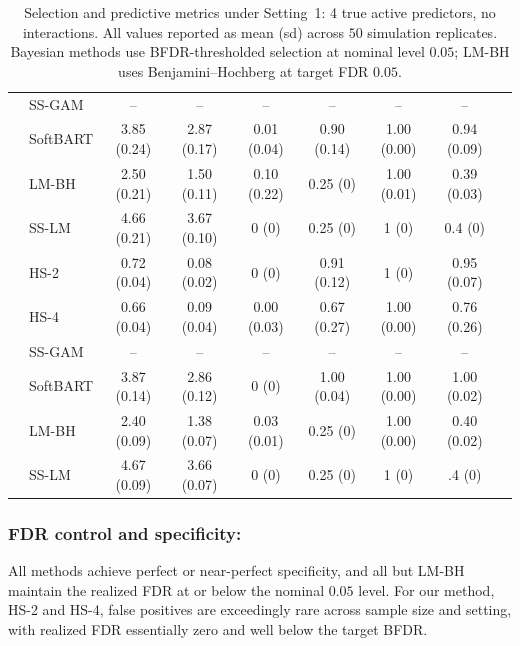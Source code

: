{\begin{table}[h]
\begin{tabular}{@{}l l c c c c c c c@{}}
 & SS-GAM       & -- & -- & -- & -- & -- & -- \\
 & SoftBART     & 3.85 (0.24) & 2.87 (0.17) & 0.01 (0.04)  & 0.90 (0.14) & 1.00 (0.00)   & 0.94 (0.09)\\
 & LM-BH        & 2.50 (0.21) & 1.50 (0.11) & 0.10 (0.22) & 0.25 (0) & 1.00 (0.01) & 0.39 (0.03) \\
 & SS-LM        & 4.66 (0.21) & 3.67 (0.10) & 0 (0) & 0.25 (0) & 1 (0) & 0.4 (0) \\
\midrule
{}
 & HS-2         & 0.72 (0.04) & 0.08 (0.02) & 0 (0) & 0.91 (0.12) & 1 (0) & 0.95 (0.07) \\
 & HS-4         & 0.66 (0.04) & 0.09 (0.04) & 0.00 (0.03) & 0.67 (0.27) & 1.00 (0.00) & 0.76 (0.26) \\
 & SS-GAM       & -- & -- & -- & -- & -- & -- \\
 & SoftBART     & 3.87 (0.14) & 2.86 (0.12) & 0 (0) &1.00 (0.04)  & 1.00 (0.00) & 1.00 (0.02) \\
 & LM-BH        & 2.40 (0.09) & 1.38 (0.07) & 0.03 (0.01) & 0.25 (0) & 1.00 (0.00) & 0.40 (0.02) \\
 & SS-LM        & 4.67 (0.09) & 3.66 (0.07) & 0 (0) & 0.25 (0) & 1 (0) & .4 (0) \\
\bottomrule
\end{tabular}
\caption{Selection and predictive metrics under Setting~1: 4 true active predictors, no interactions.  All values reported as mean (sd) across $50$ simulation replicates.  Bayesian methods use BFDR-thresholded selection at nominal level $0.05$; LM-BH uses Benjamini--Hochberg at target FDR $0.05$.}
\label{tab:ch3-setting1}
\end{table}


\subsubsection*{FDR control and specificity:}
All methods achieve perfect or near-perfect specificity, and all but
LM-BH maintain the realized FDR at or below the nominal $0.05$ level.  For our method,
HS-2 and HS-4, false positives are exceedingly rare across sample size and setting, 
with realized FDR essentially zero and well below the target BFDR.



}
